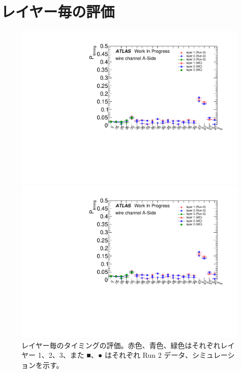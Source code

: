 \section{レイヤー毎の評価}
\begin{figure}[H]
	\begin{minipage}{0.49\hsize}
	\centering
	\includegraphics[width=\textwidth,page=1]{img/pdf5/master_lyrcomp.pdf}
	\end{minipage}
	\begin{minipage}{0.49\hsize}
	\centering
	\includegraphics[width=\textwidth,page=2]{img/pdf5/master_lyrcomp.pdf}
	\end{minipage}
	\caption[レイヤー毎のタイミングの評価]{レイヤー毎のタイミングの評価。赤色、青色、緑色はそれぞれレイヤー 1、2、3、また ■、● はそれぞれ Run 2 データ、シミュレーションを示す。}
	\label{fig:timingPlotlyr}
\end{figure}